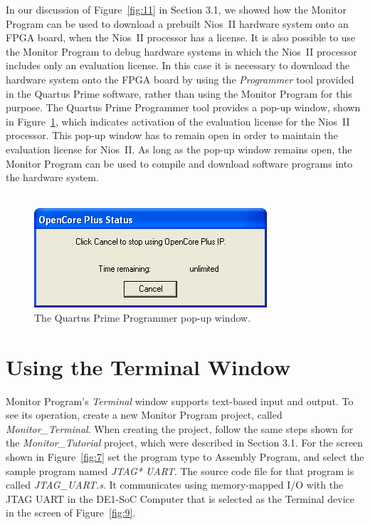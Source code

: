 \documentclass[11pt, twoside, pdftex]{article}
\begin{document}
In our discussion of Figure~\ref{fig:11} in Section 3.1,
we showed how the Monitor Program can be used to download a
prebuilt Nios~II hardware system onto an FPGA board, when the
Nios~II processor has a license. It is also possible to use the
Monitor Program to debug hardware systems in which the Nios~II
processor includes only an evaluation license. In this case
it is necessary to download the hardware system onto the FPGA
board by using the {\it Programmer} tool provided in the 
Quartus Prime software, rather than using the Monitor Program for
this purpose. The Quartus Prime Programmer tool provides a pop-up
window, shown in Figure~\ref{fig:22}, which indicates activation of
the evaluation license for the Nios~II processor. 
This pop-up window has to remain open in order to maintain the
evaluation license for Nios~II. As long as the pop-up
window remains open, the Monitor Program can be used to compile
and download software programs into the hardware system.
~\\
~\\

\begin{figure}[H]
   \begin{center}
      \includegraphics[scale=1]{screenshots/figure22.png}
   \end{center}
   \caption{The Quartus Prime Programmer pop-up window.} 
	 \label{fig:22}
\end{figure}

\section{Using the Terminal Window}

Monitor Program's \emph{Terminal} window supports
text-based input and output. To see its operation, create
a new Monitor Program project, called {\it Monitor\_Terminal}.
When creating the project, follow the same steps shown for the
{\it Monitor\_Tutorial} project, which were described in 
Section 3.1. For the screen shown in Figure~\ref{fig:7} set the program
type to {\sf Assembly Program}, and select the
sample program named {\it JTAG* UART}. The source code file 
for that program is called {\it JTAG\_UART.s}.  
It communicates using memory-mapped I/O with the JTAG UART in 
the DE1-SoC Computer that is selected as 
the {\sf Terminal device} in the screen of Figure~\ref{fig:9}.
\end{document}
